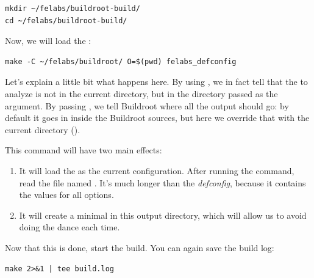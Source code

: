 \begin{verbatim}
mkdir ~/felabs/buildroot-build/
cd ~/felabs/buildroot-build/
\end{verbatim}

Now, we will load the :

\begin{verbatim}
make -C ~/felabs/buildroot/ O=$(pwd) felabs_defconfig
\end{verbatim}

Let's explain a little bit what happens here. By using
, we in fact tell  that the
 to analyze is not in the current directory, but in the
directory passed as the  argument. By passing , we
tell Buildroot where all the output should go: by default it goes in
 inside the Buildroot sources, but here we override that
with the current directory ().

This command will have two main effects:

\begin{enumerate}

\item It will load the  as the current
  configuration. After running the command, read the file named
  . It's much longer than the {\em defconfig}, because
  it contains the values for all options.

\item It will create a minimal  in this output
  directory, which will allow us to avoid doing the  dance each time.

\end{enumerate}

Now that this is done, start the build. You can again save the build
log:

\begin{verbatim}
make 2>&1 | tee build.log
\end{verbatim}

